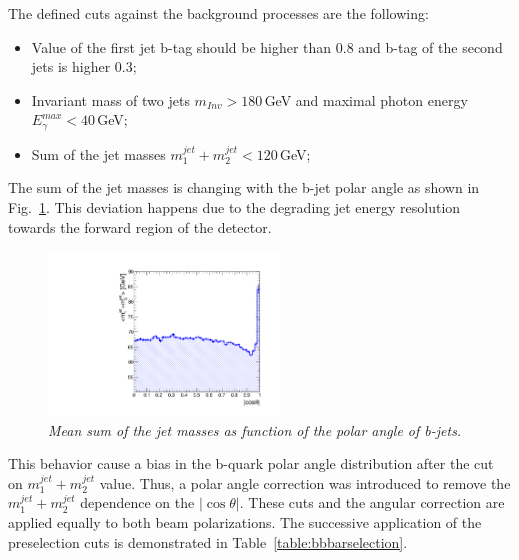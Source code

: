 The defined cuts against the background processes are the following:
\begin{itemize}
	\item Value of the first jet b-tag should be higher than 0.8 and b-tag of the second jets is higher 0.3;
	\item Invariant mass of two jets $m_{Inv} > 180$\,GeV and maximal photon energy $E^{max}_\gamma < 40$\,GeV;
	\item Sum of the jet masses $m^{jet}_1+m^{jet}_2<120$\,GeV;
\end{itemize}
The sum of the jet masses is changing with the b-jet polar angle as shown in Fig.~\ref{fig:JetMasses_3}. This deviation happens due to the degrading jet energy resolution towards the forward region of the detector. 
\begin{figure}
	{\centering
		\includegraphics[width=0.55\textwidth]{ILD/plots/mass-correction.pdf}
		\caption{\sl Mean sum of the jet masses as function of the polar angle of b-jets.   
		}
		\label{fig:JetMasses_3}
	}
	
\end{figure}
This behavior cause a bias in the b-quark polar angle distribution after the cut on  $m^{jet}_1+m^{jet}_2$ value. 
Thus, a polar angle correction was introduced to remove the $m^{jet}_1+m^{jet}_2$ dependence on the $|\cos\theta|$.
These cuts and the angular correction are applied equally to both beam polarizations.
The successive application of the preselection cuts is demonstrated in Table~\ref{table:bbbarselection}.




